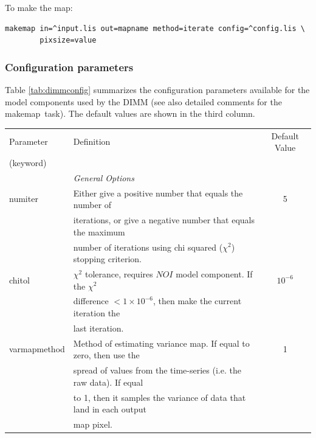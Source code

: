 \documentclass[twoside,11pt]{article}
\newcommand{\xref}[3]{#1}
\renewcommand{\_}{\texttt{\symbol{95}}}
\newcommand{\task}[1]{\textsf{#1}}
\newcommand{\makemap}{\xref{\task{makemap}}{sun258}{MAKEMAP}}
\begin{document}
To make the map:
\begin{verbatim}
makemap in=^input.lis out=mapname method=iterate config=^config.lis \
        pixsize=value
\end{verbatim}


\subsubsection{Configuration parameters}

Table \ref{tab:dimmconfig} summarizes the configuration parameters
available for the model components used by the DIMM (see also detailed
comments for the \makemap\ task). The default values are shown in the
third column.

\begin{table}
\footnotesize
\centering
\begin{tabular}{llc}
\hline
Parameter        & Definition                                                         &  Default Value \\
(keyword)        &                                                                    & \\
\hline
                 & \multicolumn{2}{l}{\em General Options} \\
\hline
numiter          & Either give a positive number that equals the number of             & 5\\
                 & iterations, or give a negative number that equals the maximum       & \\
                 & number of iterations using chi squared ($\chi^2$) stopping criterion.& \\
chitol           & $\chi^2$ tolerance, requires $NOI$ model component. If the $\chi^2$ & $10^{-6}$\\
                 & difference $<1\times10^{-6}$, then make the current iteration the   & \\
                 & last iteration.                                                     & \\
varmapmethod     & Method of estimating variance map. If equal to zero, then use the   & 1 \\
                 & spread of values from the time-series (i.e. the raw data). If equal & \\
                 & to 1, then it samples the variance of data that land in each output & \\
                 & map pixel.                                                          & \\

\end{tabular}
\end{table}
\end{document}

